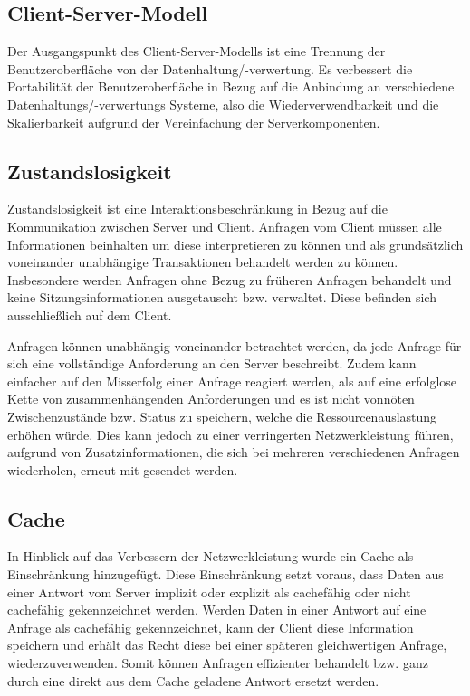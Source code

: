 \subsection{Client-Server-Modell}
Der Ausgangspunkt des Client-Server-Modells ist eine Trennung der Benutzeroberfläche von der Datenhaltung/-verwertung.
Es verbessert die Portabilität der Benutzeroberfläche in Bezug auf die Anbindung an verschiedene Datenhaltungs/-verwertungs Systeme,
also die Wiederverwendbarkeit und die Skalierbarkeit aufgrund der Vereinfachung der Serverkomponenten.

\subsection{Zustandslosigkeit}
Zustandslosigkeit ist eine Interaktionsbeschränkung in Bezug auf die Kommunikation zwischen Server und Client. 
Anfragen vom Client müssen alle Informationen beinhalten um diese interpretieren zu können und als grundsätzlich voneinander unabhängige Transaktionen behandelt werden zu können.
Insbesondere werden Anfragen ohne Bezug zu früheren Anfragen behandelt und keine Sitzungsinformationen ausgetauscht bzw. verwaltet.
Diese befinden sich ausschließlich auf dem Client. 

Anfragen können unabhängig voneinander betrachtet werden, da jede Anfrage für sich eine vollständige Anforderung an den Server beschreibt.
Zudem kann einfacher auf den Misserfolg einer Anfrage reagiert werden, als auf eine erfolglose Kette von zusammenhängenden Anforderungen 
und es ist nicht vonnöten Zwischenzustände bzw. Status zu speichern, welche die Ressourcenauslastung erhöhen würde.
Dies kann jedoch zu einer verringerten Netzwerkleistung führen, aufgrund von Zusatzinformationen, 
die sich bei mehreren verschiedenen Anfragen wiederholen, erneut mit gesendet werden.

\subsection{Cache}
In Hinblick auf das Verbessern der Netzwerkleistung wurde ein Cache als Einschränkung hinzugefügt.
Diese Einschränkung setzt voraus, dass Daten aus einer Antwort vom Server implizit oder explizit als cachefähig oder nicht cachefähig gekennzeichnet werden.
Werden Daten in einer Antwort auf eine Anfrage als cachefähig gekennzeichnet, kann der Client diese Information speichern und erhält das Recht diese
bei einer späteren gleichwertigen Anfrage, wiederzuverwenden.
Somit können Anfragen effizienter behandelt bzw. ganz durch eine direkt aus dem Cache geladene Antwort ersetzt werden.

